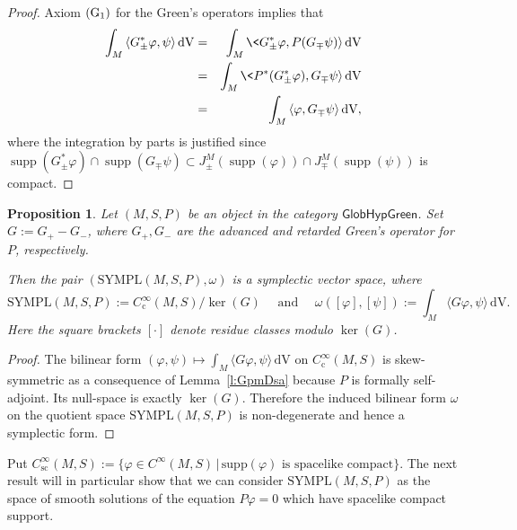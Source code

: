 \documentclass[a4paper,11pt]{amsart}
\newtheorem{prop}[thm]{Proposition}
\theoremstyle{definition}
\begin{document}
\begin{proof}
Axiom ${\rm (G_1)}$ for the Green's operators implies that
\begin{eqnarray*} 
\int_M{\langle} G_\pm^*{\varphi},\psi{\rangle}{\,\mathrm{dV}}&=&\int_M\<G_\pm^*{\varphi},P(G_\mp\psi){\rangle}{\,\mathrm{dV}}\\
&=&\int_M\<P^*(G_\pm^*{\varphi}),G_\mp \psi{\rangle}{\,\mathrm{dV}}\\
&=&\int_M{\langle}{\varphi},G_\mp \psi{\rangle}{\,\mathrm{dV}},
\end{eqnarray*}
where the integration by parts is justified since ${\operatorname{supp}}(G_\pm^*{\varphi})\cap{\operatorname{supp}}(G_\mp\psi)\subset J_\pm^M({\operatorname{supp}}({\varphi}))\cap J_\mp^M({\operatorname{supp}}(\psi))$ is compact.
\end{proof}

\begin{prop}\label{p:symplstruct}
Let $(M,S,P)$ be an object in the category ${\mathsf{GlobHypGreen}}$.
Set $G:=G_+-G_-$, where $G_+, G_-$ are the advanced and retarded Green's operator for $P$, respectively.

Then the pair $({\mathrm{SYMPL}}(M,S,P),\omega)$ is a symplectic vector space, where
\[
{\mathrm{SYMPL}}(M,S,P):={C^\infty_\mathrm{c}}(M,S)/\ker(G)
\quad\mbox{ and }\quad
\omega([{\varphi}],[\psi]):=\int_M{\langle} G{\varphi},\psi{\rangle} {\,\mathrm{dV}}.
\]
Here the square brackets $[\cdot]$ denote residue classes modulo $\ker(G)$.
\end{prop}

\begin{proof}
The bilinear form $({\varphi},\psi)\mapsto\int_M{\langle} G{\varphi},\psi{\rangle} {\,\mathrm{dV}}$ on ${C^\infty_\mathrm{c}}(M,S)$ is skew-symmetric as a consequence of Lemma~\ref{l:GpmDsa} because $P$ is formally self-adjoint. 
Its null-space is exactly $\ker(G)$. 
Therefore the induced bilinear form $\omega$ on the quotient space ${\mathrm{SYMPL}}(M,S,P)$ is non-degenerate and hence a symplectic form.
\end{proof}

Put ${C^\infty_\mathrm{sc}}(M,S):=\{{\varphi}\in {C^\infty}(M,S)\,|\,\mathrm{supp}({\varphi})\textrm{ is spacelike compact}\}$.
The next result will in particular show that we can consider ${\mathrm{SYMPL}}(M,S,P)$ as the space of smooth solutions of the equation $P{\varphi}=0$ which have spacelike compact support.
\end{document}
